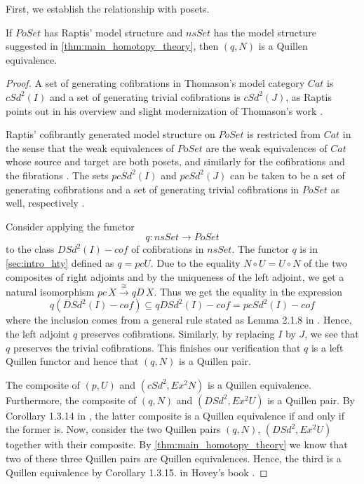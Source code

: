 First, we establish the relationship with posets.
\begin{lemma}\label{cor:square_of_quillen_equivalences}
If $PoSet$ has Raptis' model structure \cite{Ra10} and $nsSet$ has the model structure suggested in \cref{thm:main_homotopy_theory}, then $(q,N)$ is a Quillen equivalence.
\end{lemma}
\begin{proof}
A set of generating cofibrations in Thomason's model category $Cat$ is $cSd^2(I)$ and a set of generating trivial cofibrations is $cSd^2(J)$, as Raptis points out in his overview and slight modernization of Thomason's work \cite[Thm.~2.2, p.~215]{Ra10}.

Raptis' cofibrantly generated model structure on $PoSet$ is restricted from $Cat$ in the sense that the weak equivalences of $PoSet$ are the weak equivalences of $Cat$ whose source and target are both posets, and similarly for the cofibrations and the fibrations \cite[Thm.~2.6 ,p.~217]{Ra10}. The sets $pcSd^2(I)$ and $pcSd^2(J)$ can be taken to be a set of generating cofibrations and a set of generating trivial cofibrations in $PoSet$ as well, respectively \cite[Thm.~2.6, p.~217]{Ra10}.

Consider applying the functor
\[q:nsSet\to PoSet\]
to the class $DSd^2(I)-cof$ of cofibrations in $nsSet$. The functor $q$ is in \cref{sec:intro_hty} defined as $q=pcU$. Due to the equality $N\circ U=U\circ N$ of the two composites of right adjoints and by the uniqueness of the left adjoint, we get a natural isomorphism $pc\, X\xrightarrow{\cong } qD\, X$. Thus we get the equality in the expression
\[q(DSd^2(I)-cof)\subseteq qDSd^2(I)-cof=pcSd^2(I)-cof\]
where the inclusion comes from a general rule stated as Lemma 2.1.8 in \cite[p.~30]{Ho99}. Hence, the left adjoint $q$ preserves cofibrations. Similarly, by replacing $I$ by $J$, we see that $q$ preserves the trivial cofibrations. This finishes our verification that $q$ is a left Quillen functor and hence that $(q,N)$ is a Quillen pair.

The composite of $(p,U)$ and $(cSd^2,Ex^2N)$ is a Quillen equivalence. Furthermore, the composite of $(q,N)$ and $(DSd^2,Ex^2U)$ is a Quillen pair. By Corollary 1.3.14 in \cite[p.~20]{Ho99}, the latter composite is a Quillen equivalence if and only if the former is. Now, consider the two Quillen pairs $(q,N)$, $(DSd^2,Ex^2U)$ together with their composite. By \cref{thm:main_homotopy_theory} we know that two of these three Quillen pairs are Quillen equivalences. Hence, the third is a Quillen equivalence by Corollary 1.3.15. in Hovey's book \cite[p.~21]{Ho99}.
\end{proof}
